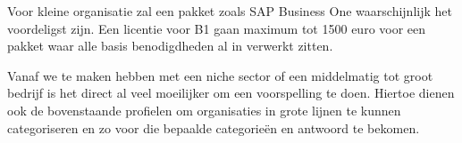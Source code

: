 \documentclass{hogent-article}
\begin{document}
Voor kleine organisatie zal een pakket zoals SAP Business One waarschijnlijk het voordeligst zijn. Een licentie voor B1 gaan maximum tot 1500 euro voor een pakket waar alle basis benodigdheden al in verwerkt zitten.\par

Vanaf we te maken hebben met een niche sector of een middelmatig tot groot bedrijf is het direct al veel moeilijker om een voorspelling te doen. Hiertoe dienen ook de bovenstaande profielen om organisaties in grote lijnen te kunnen categoriseren en zo voor die bepaalde categorieën en antwoord te bekomen.


\printbibliography[heading=bibintoc]
\end{document}
